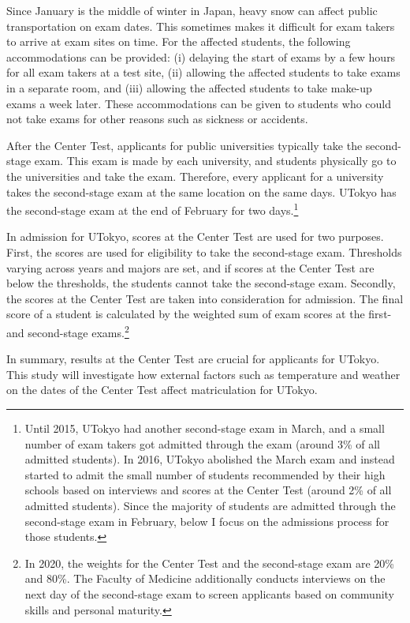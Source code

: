 \documentclass[12pt,letterpaper]{article}
\begin{document}
Since January is the middle of winter in Japan, heavy snow can affect public transportation on exam dates.
This sometimes makes it difficult for exam takers to arrive at exam sites on time.
For the affected students, the following accommodations can be provided:
(i) delaying the start of exams by a few hours for all exam takers at a test site,
(ii) allowing the affected students to take exams in a separate room, and
(iii) allowing the affected students to take make-up exams a week later.
These accommodations can be given to students who could not take exams for other reasons such as sickness or accidents.

After the Center Test, applicants for public universities typically take the second-stage exam.
This exam is made by each university, and students physically go to the universities and take the exam.
Therefore, every applicant for a university takes the second-stage exam at the same location on the same days.
UTokyo has the second-stage exam at the end of February for two days.\footnote{
  Until 2015, UTokyo had another second-stage exam in March, and a small number of exam takers got admitted through the exam (around 3\% of all admitted students).
  In 2016, UTokyo abolished the March exam and instead started to admit the small number of students recommended by their high schools based on interviews and scores at the Center Test (around 2\% of all admitted students).
  Since the majority of students are admitted through the second-stage exam in February, below I focus on the admissions process for those students. 
}

In admission for UTokyo, scores at the Center Test are used for two purposes.
First, the scores are used for eligibility to take the second-stage exam.
Thresholds varying across years and majors are set, and if scores at the Center Test are below the thresholds, the students cannot take the second-stage exam.
Secondly, the scores at the Center Test are taken into consideration for admission.
The final score of a student is calculated by the weighted sum of exam scores at the first- and second-stage exams.\footnote{
  In 2020, the weights for the Center Test and the second-stage exam are 20\% and 80\%.
  The Faculty of Medicine additionally conducts interviews on the next day of the second-stage exam to screen applicants based on community skills and personal maturity.
}

In summary, results at the Center Test are crucial for applicants for UTokyo.
This study will investigate how external factors such as temperature and weather on the dates of the Center Test affect matriculation for UTokyo.
\end{document}
